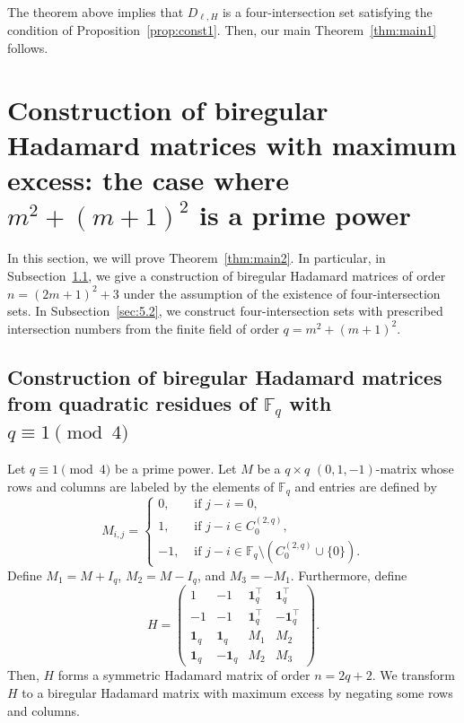 \documentclass[ALCO,ThmDefs,Unicode]{cedram}
\newcommand*\F{{\mathbb F}}
\newcommand*\tra{\top}
\newcommand*{\un}{\mathbf{1}}
\begin{document}
The theorem above implies that $D_{\ell,H}$ is a four-intersection set satisfying the condition of Proposition~\ref{prop:const1}. Then, our main Theorem~\ref{thm:main1} follows.


\section{Construction of biregular Hadamard matrices with maximum excess: the case where \texorpdfstring{$m^2+(m+1)^2$}{m2+(m+1)2} is a prime power}\label{sec:const2}

In this section, we will prove Theorem~\ref{thm:main2}. In particular, in Subsection~\ref{subsec:const2}, we give a construction of biregular Hadamard matrices of order $n=(2m+1)^2+3$ under the assumption of the existence of four-intersection sets. In Subsection~\ref{sec:5.2}, we construct four-intersection sets with prescribed intersection numbers from the finite field of order $q=m^2+(m+1)^2$.

\subsection{Construction of biregular Hadamard matrices from quadratic residues of \texorpdfstring{$\F_q$}{Fq} with \texorpdfstring{$q\equiv 1\pmod{4}$}{q = 1 (mod 4)}}\label{subsec:const2}

Let $q\equiv 1\pmod{4}$ be a prime power. Let $M$ be a $q\times q$ $(0,1,-1)$-matrix whose rows and columns are labeled by the elements of $\F_q$ and entries are defined by
\[
M_{i,j}=
\begin{cases}
0,& \text{ if } j-i=0,\\
1,& \text{ if } j-i\in C_0^{(2,q)},\\
-1,& \text{ if } j-i\in \F_q \setminus (C_0^{(2,q)} \cup \{0\}).
\end{cases}
\]
Define $M_1=M+I_q$, $M_2=M-I_q$, and $M_3=-M_1$. Furthermore, define
\begin{equation}\label{eq:hada2}
H=
\begin{pmatrix}
1 &-1 & \un_q^\tra& \un_q^\tra \\
-1 & -1 & \un_q^\tra&-\un_q^\tra \\
\un_q & \un_q &M_1 & M_2 \\
\un_q & -\un_q&M_2 & M_3
\end{pmatrix}.
\end{equation}
Then, $H$ forms a symmetric Hadamard matrix of order $n=2q+2$. We transform $H$ to a biregular Hadamard matrix with maximum excess by negating some rows and columns.
\end{document}
